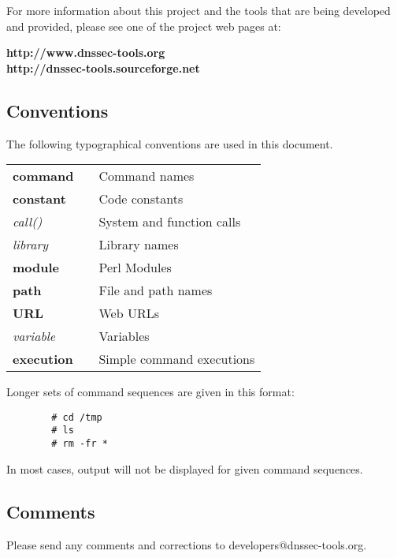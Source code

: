 \documentclass[12pt]{article}
\newcommand{\cmd}[1]{{\bf #1}}
\newcommand{\const}[1]{{\bf #1}}
\newcommand{\func}[1]{{\em #1}}
\newcommand{\lib}[1]{{\em #1}}
\newcommand{\perlmod}[1]{{\bf #1}}
\newcommand{\path}[1]{{\bf #1}}
\newcommand{\url}[1]{{\bf #1}}
\newcommand{\var}[1]{{\em #1}}
\newcommand{\xqt}[1]{{\bf #1}}
\begin{document}
For more information about this project and the tools that are being developed
and provided, please see one of the project web pages at:

\url{http://www.dnssec-tools.org}  \\
\url{http://dnssec-tools.sourceforge.net}


\clearpage

\subsection{\bf Conventions}

The following typographical conventions are used in this document.

\begin{table}[hb]
\begin{tabular}{lll}
\cmd{command}		& & Command names\\
\const{constant}	& & Code constants\\
\func{call()}		& & System and function calls\\
\lib{library}		& & Library names\\
\perlmod{module}	& & Perl Modules\\
\path{path}		& & File and path names\\
\url{URL}		& & Web URLs\\
\var{variable}		& & Variables\\
\xqt{execution}		& & Simple command executions\\
\end{tabular}
\end{table}

Longer sets of command sequences are given in this format:
\begin{verbatim}
        # cd /tmp
        # ls
        # rm -fr *
\end{verbatim}
In most cases, output will not be displayed for given command sequences.

\vspace{.25in}

\subsection{\bf Comments}

Please send any comments and corrections to developers@dnssec-tools.org.

\end{document}
